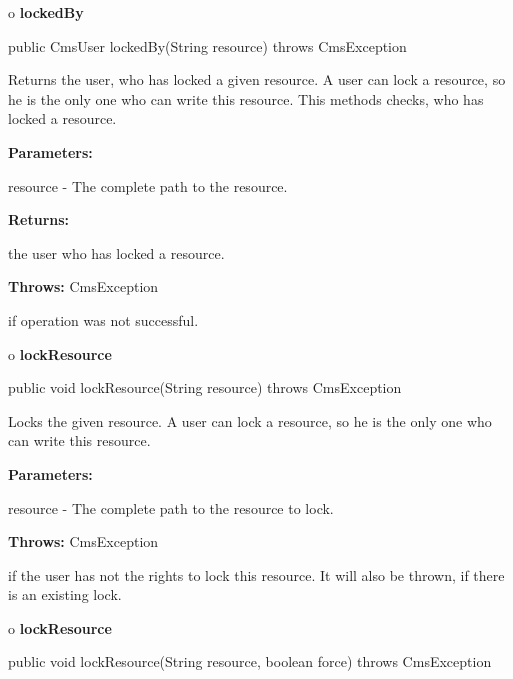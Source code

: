 o {\bf lockedBy} 

\begin{PRE}
 public CmsUser lockedBy(String resource) throws CmsException
\end{PRE}

\begin{description}
\htmlDD Returns the user, who has locked a given resource. \htmlBR
A user can lock a resource, so he is the only one who can write this resource.
This methods checks, who has locked a resource. 

\begin{description}
\item {\bf Parameters:}  

resource - The complete path to the resource.  
\item {\bf Returns:}  

the user who has locked a resource.  
\item {\bf Throws:} CmsException  

if operation was not successful.  
\end{description}

\end{description}

o {\bf lockResource} 

\begin{PRE}
 public void lockResource(String resource) throws CmsException
\end{PRE}

\begin{description}
\htmlDD Locks the given resource. \htmlBR
A user can lock a resource, so he is the only one who can write this resource.


\begin{description}
\item {\bf Parameters:}  

resource - The complete path to the resource to lock.  
\item {\bf Throws:} CmsException  

if the user has not the rights to lock this resource. It will also be thrown,
if there is an existing lock.  
\end{description}

\end{description}

o {\bf lockResource} 

\begin{PRE}
 public void lockResource(String resource,
                          boolean force) throws CmsException
\end{PRE}

